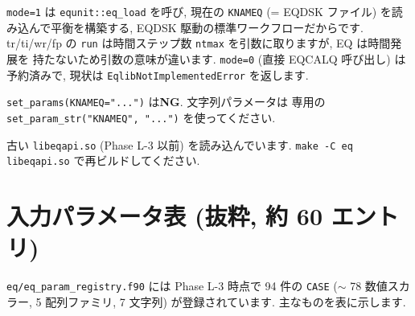 \documentclass[11pt,a4paper]{report}
\begin{document}
\begin{faq}[Q2. なぜ \texttt{eq.run()} のデフォルトが \texttt{mode=1}?]
\texttt{mode=1} は \texttt{equnit::eq\_load} を呼び, 現在の
\texttt{KNAMEQ} (= EQDSK ファイル) を読み込んで平衡を構築する,
EQDSK 駆動の標準ワークフローだからです. tr/ti/wr/fp の \texttt{run}
は時間ステップ数 \texttt{ntmax} を引数に取りますが, EQ は時間発展を
持たないため引数の意味が違います. \texttt{mode=0} (直接 EQCALQ
呼び出し) は予約済みで, 現状は \texttt{EqlibNotImplementedError}
を返します.
\end{faq}

\begin{faq}
\texttt{set\_params(KNAMEQ="...")} は\textbf{NG}. 文字列パラメータは
専用の \texttt{set\_param\_str("KNAMEQ", "...")} を使ってください.
\end{faq}

\begin{faq}
古い \texttt{libeqapi.so} (Phase L-3 以前) を読み込んでいます.
\texttt{make -C eq libeqapi.so} で再ビルドしてください.
\end{faq}

\section{入力パラメータ表 (抜粋, 約 60 エントリ)}

\texttt{eq/eq\_param\_registry.f90} には Phase L-3 時点で 94 件の
\texttt{CASE} (\(\sim\) 78 数値スカラー, 5 配列ファミリ, 7 文字列)
が登録されています. 主なものを表に示します.
\end{document}
